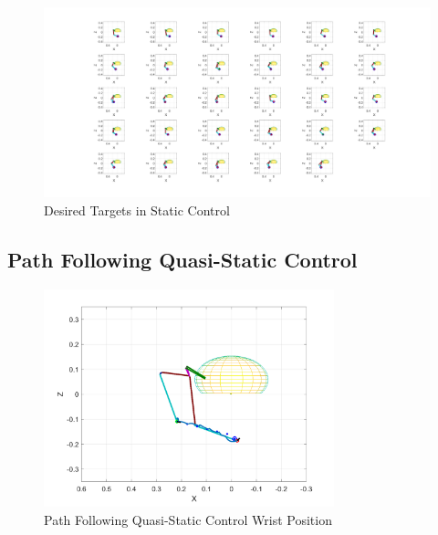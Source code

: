\newpage
\begin{landscape} %
  \begin{figure}[h!]
    \centering
    \includegraphics[width=1.9\textwidth]{Pictures/Controller/Static29positions.png} %
    \caption{Desired Targets in Static Control} %
    \label{29statics}

  \end{figure}
\end{landscape} %




\subsection{Path Following Quasi-Static Control}
\begin{figure}[h!]
\centering
\includegraphics[width=0.75\textwidth]{Pictures/Controller/Healthy_WP.png} 
\caption{Path Following Quasi-Static Control Wrist Position} %
\label{fig:PFWP} %
\end{figure}

